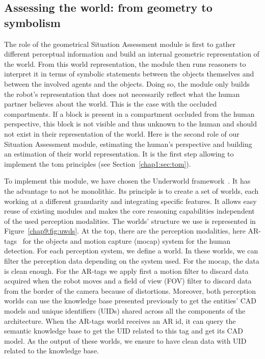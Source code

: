 \documentclass[a4paper,11pt,twoside]{StyleThese}
\begin{document}
\subsection{Assessing the world: from geometry to symbolism}

The role of the geometrical Situation Assessment module is first to gather different perceptual information and build an internal geometric representation of the world. From this world representation, the module then runs reasoners to interpret it in terms of symbolic statements between the objects themselves and between the involved agents and the objects. Doing so, the module only builds the robot's representation that does not necessarily reflect what the human partner believes about the world. This is the case with the occluded compartments. If a block is present in a compartment occluded from the human perspective, this block is not visible and thus unknown to the human and should not exist in their representation of the world. Here is the second role of our Situation Assessment module, estimating the human's perspective and building an estimation of their world representation. It is the first step allowing to implement the \acrshort{tom} principles (see Section~\ref{chap1:sec:tom}).

To implement this module, we have chosen the Underworld framework~\citep{lemaignan_2018_underworlds}. It has the advantage to not be monolithic. Its principle is to create a set of worlds, each working at a different granularity and integrating specific features. It allows easy reuse of existing modules and makes the core reasoning capabilities independent of the used perception modalities. The worlds' structure we use is represented in Figure~\ref{chap9:fig:uwds}. At the top, there are the perception modalities, here AR-tags~\citep{fiala_2005_artag} for the objects and motion capture (mocap) system for the human detection. For each perception system, we define a world. In these worlds, we can filter the perception data depending on the system used. For the mocap, the data is clean enough. For the AR-tags we apply first a motion filter to discard data acquired when the robot moves and a field of view (FOV) filter to discard data from the border of the camera because of distortions. Moreover, both perception worlds can use the knowledge base presented previously to get the entities' CAD models and unique identifiers (UIDs) shared across all the components of the architecture. When the AR-tags world receives an AR id, it can query the semantic knowledge base to get the UID related to this tag and get its CAD model. As the output of these worlds, we ensure to have clean data with UID related to the knowledge base.
\end{document}
